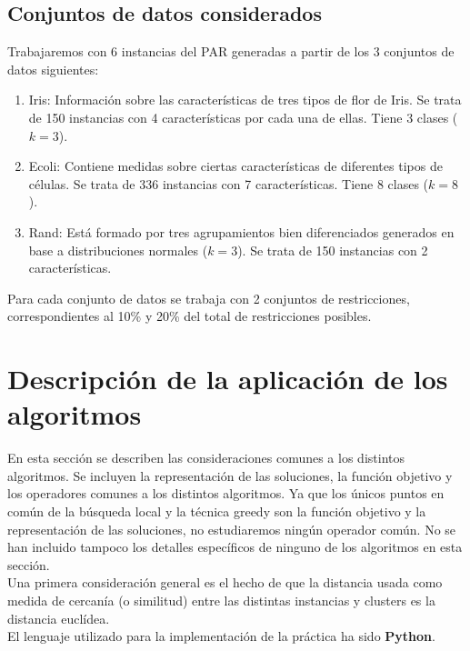 \documentclass[11pt,a4paper]{article}
\begin{document}
	\subsection{Conjuntos de datos considerados}
	Trabajaremos con 6 instancias del PAR generadas a partir de los 3 conjuntos de datos siguientes:
	\begin{enumerate}
        \item Iris: Información sobre las características de tres tipos de flor de Iris. Se trata de 150 instancias con 4 características por cada una de ellas. Tiene 3 clases ($k = 3$).
        \item Ecoli: Contiene medidas sobre ciertas características de diferentes tipos de células. Se trata de 336 instancias con 7 características. Tiene 8 clases ($k = 8$).
        \item Rand: Está formado por tres agrupamientos bien diferenciados generados en base a distribuciones normales ($k = 3$). Se trata de 150 instancias con 2 características.
  \end{enumerate}
    
    Para cada conjunto de datos se trabaja con 2 conjuntos de restricciones, correspondientes al 10\% y 20\% del total de restricciones posibles.
	
	
	\section{Descripción de la aplicación de los algoritmos}\label{sec:comun}
	
	En esta sección se describen las consideraciones comunes a los distintos algoritmos. Se incluyen la representación de las soluciones, la función objetivo y los operadores comunes a los distintos algoritmos. Ya que los únicos puntos en común de la búsqueda local y la técnica greedy son la función objetivo y la representación de las soluciones, no estudiaremos ningún operador común. No se han incluido tampoco los detalles específicos de ninguno de los algoritmos en esta sección.  \\
	
	Una primera consideración general es el hecho de que la distancia usada como medida de cercanía (o similitud) entre las distintas instancias y clusters es la distancia euclídea. \\
	
	El lenguaje utilizado para la implementación de la práctica ha sido \textbf{Python}. 
	
\end{document}
